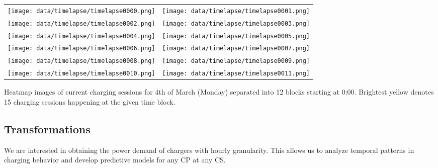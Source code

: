 \begin{marginfigure}
    \begin{tabular}{cc}
        \texttt{[image: data/timelapse/timelapse0000.png]} &
        \texttt{[image: data/timelapse/timelapse0001.png]}   \\
        \texttt{[image: data/timelapse/timelapse0002.png]} &
        \texttt{[image: data/timelapse/timelapse0003.png]}   \\
        \texttt{[image: data/timelapse/timelapse0004.png]} &
        \texttt{[image: data/timelapse/timelapse0005.png]}   \\
        \texttt{[image: data/timelapse/timelapse0006.png]} &
        \texttt{[image: data/timelapse/timelapse0007.png]}   \\
        \texttt{[image: data/timelapse/timelapse0008.png]} &
        \texttt{[image: data/timelapse/timelapse0009.png]}   \\
        \texttt{[image: data/timelapse/timelapse0010.png]} &
        \texttt{[image: data/timelapse/timelapse0011.png]}   \\
    \end{tabular}
    \caption{Heatmap images of current charging sessions for 4th of March (Monday) separated into 12 blocks starting at 0:00. Brightest yellow denotes 15 charging sessions happening at the given time block.}
    \label{fig:timelapse-grid-full}
\end{marginfigure}




\subsection{Transformations}

We are interested in obtaining the power demand of chargers with hourly granularity. This allows us to analyze temporal patterns in charging behavior and develop predictive models for any \acrlong{CP} at any \acrlong{CS}.



